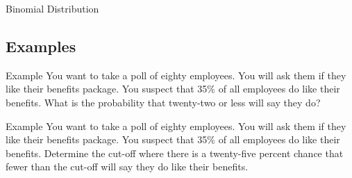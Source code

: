 \begin{frame}{Binomial Distribution}

  
\end{frame}

\subsection{Examples}

\begin{frame}{Example}
  You want to take a poll of eighty employees. You will ask them if
  they like their benefits package. You suspect that 35\% of all
  employees do like their benefits. What is the probability that
  twenty-two or less will say they do?
\end{frame}


\begin{frame}{Example}
  You want to take a poll of eighty employees. You will ask them if
  they like their benefits package. You suspect that 35\% of all
  employees do like their benefits. Determine the cut-off where there
  is a twenty-five percent chance that fewer than the cut-off will say
  they do like their benefits.
\end{frame}


